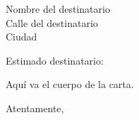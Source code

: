 \documentclass{letter}
\begin{document}
\begin{letter}{Nombre del destinatario \\ Calle del destinatario \\ Ciudad}
\opening{Estimado destinatario:}

Aquí va el cuerpo de la carta.

\closing{Atentamente,}

\end{letter}
\end{document}
